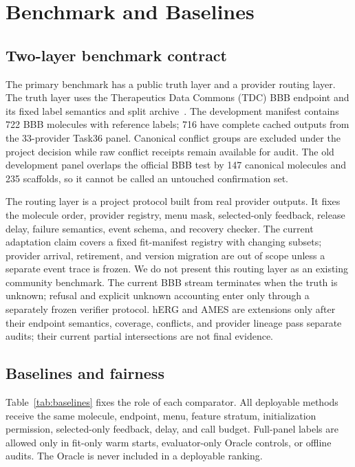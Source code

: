 \documentclass[sigconf,anonymous]{aamas}
\begin{document}
\section{Benchmark and Baselines}
\subsection{Two-layer benchmark contract}
The primary benchmark has a public truth layer and a provider routing layer. The truth layer uses the Therapeutics Data Commons (TDC) BBB endpoint and its fixed label semantics and split archive~\cite{huang2021tdc}. The development manifest contains 722 BBB molecules with reference labels; 716 have complete cached outputs from the 33-provider Task36 panel. Canonical conflict groups are excluded under the project decision while raw conflict receipts remain available for audit. The old development panel overlaps the official BBB test by 147 canonical molecules and 235 scaffolds, so it cannot be called an untouched confirmation set.

The routing layer is a project protocol built from real provider outputs. It fixes the molecule order, provider registry, menu mask, selected-only feedback, release delay, failure semantics, event schema, and recovery checker. The current adaptation claim covers a fixed fit-manifest registry with changing subsets; provider arrival, retirement, and version migration are out of scope unless a separate event trace is frozen. We do not present this routing layer as an existing community benchmark. The current BBB stream terminates when the truth is unknown; refusal and explicit unknown accounting enter only through a separately frozen verifier protocol. hERG and AMES are extensions only after their endpoint semantics, coverage, conflicts, and provider lineage pass separate audits; their current partial intersections are not final evidence.

\subsection{Baselines and fairness}
Table~\ref{tab:baselines} fixes the role of each comparator. All deployable methods receive the same molecule, endpoint, menu, feature stratum, initialization permission, selected-only feedback, delay, and call budget. Full-panel labels are allowed only in fit-only warm starts, evaluator-only Oracle controls, or offline audits. The Oracle is never included in a deployable ranking.
\end{document}
